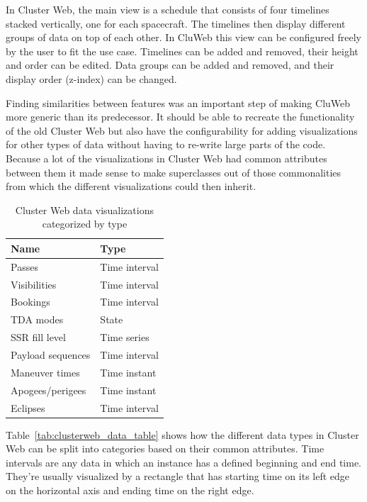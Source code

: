 In Cluster Web, the main view is a schedule that consists of four timelines stacked vertically, one for each spacecraft. The timelines then display different groups of data on top of each other. In CluWeb this view can be configured freely by the user to fit the use case. Timelines can be added and removed, their height and order can be edited. Data groups can be added and removed, and their display order (z-index) can be changed.

Finding similarities between features was an important step of making CluWeb more generic than its predecessor. It should be able to recreate the functionality of the old Cluster Web but also have the configurability for adding visualizations for other types of data without having to re-write large parts of the code. Because a lot of the visualizations in Cluster Web had common attributes between them it made sense to make superclasses out of those commonalities from which the different visualizations could then inherit.

\begin{table}[!ht]
\def\arraystretch{1.1}%
\begin{center}
  \caption{Cluster Web data visualizations categorized by type}
  \label{tab:clusterweb_data_types_table}
  \begin{tabular}{| l | l | }
    \hline
    Name & Type \\
    \hline
    Passes & Time interval \\
    Visibilities & Time interval \\
    Bookings & Time interval  \\
    TDA modes & State \\
    SSR fill level & Time series \\
    Payload sequences & Time interval \\
    Maneuver times & Time instant \\
    Apogees/perigees & Time instant \\
    Eclipses & Time interval \\
    \hline
  \end{tabular}

  \end{center}
\end{table}

Table~\ref{tab:clusterweb_data_table} shows how the different data types in Cluster Web can be split into categories based on their common attributes. Time intervals are any data in which an instance has a defined beginning and end time. They're usually visualized by a rectangle that has starting time on its left edge on the horizontal axis and ending time on the right edge.

